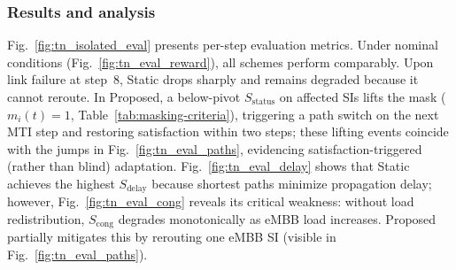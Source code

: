 \documentclass[12pt,lettersize,journal,onecolumn]{IEEEtran}
\begin{document}
\subsubsection{Results and analysis}\label{subsubsec:tn_results}
Fig.~\ref{fig:tn_isolated_eval} presents per-step evaluation metrics. Under nominal conditions (Fig.~\ref{fig:tn_eval_reward}), all schemes perform comparably. Upon link failure at step~8, Static drops sharply and remains degraded because it cannot reroute. In Proposed, a below-pivot $S_{\mathrm{status}}$ on affected SIs lifts the mask ($m_i(t)=1$, Table~\ref{tab:masking-criteria}), triggering a path switch on the next MTI step and restoring satisfaction within two steps; these lifting events coincide with the jumps in Fig.~\ref{fig:tn_eval_paths}, evidencing satisfaction-triggered (rather than blind) adaptation.
Fig.~\ref{fig:tn_eval_delay} shows that Static achieves the highest $S_{\mathrm{delay}}$ because shortest paths minimize propagation delay; however, Fig.~\ref{fig:tn_eval_cong} reveals its critical weakness: without load redistribution, $S_{\mathrm{cong}}$ degrades monotonically as eMBB load increases. Proposed partially mitigates this by rerouting one eMBB SI (visible in Fig.~\ref{fig:tn_eval_paths}).
\end{document}
